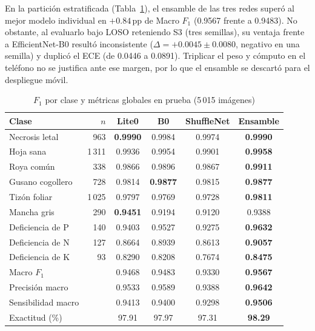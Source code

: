 \documentclass[conference,letterpaper]{IEEEtran}
\newcommand{\Fone}{$F_1$}
\begin{document}
En la partición estratificada (Tabla~\ref{tab:ensamble}), el ensamble de las tres redes superó al mejor modelo individual en $+0.84$\,pp de Macro \Fone{} (0.9567 frente a 0.9483). No obstante, al evaluarlo bajo LOSO reteniendo S3 (tres semillas), su ventaja frente a EfficientNet-B0 resultó inconsistente ($\Delta=+0.0045\pm0.0080$, negativo en una semilla) y duplicó el ECE (de 0.0446 a 0.0891). Triplicar el peso y cómputo en el teléfono no se justifica ante ese margen, por lo que el ensamble se descartó para el despliegue móvil.

\begin{table}[!t]
\caption{\Fone{} por clase y métricas globales en prueba (5\,015 imágenes)}
\label{tab:ensamble}
\centering
\scriptsize
\setlength{\tabcolsep}{3pt}
\begin{tabular}{@{}lrcccc@{}}
\toprule
\textbf{Clase} & \textbf{$n$} & \textbf{Lite0} & \textbf{B0} & \textbf{ShuffleNet} & \textbf{Ensamble} \\
\midrule
Necrosis letal & 963 & \textbf{0.9990} & 0.9984 & 0.9974 & \textbf{0.9990} \\
Hoja sana & 1\,311 & 0.9936 & 0.9954 & 0.9901 & \textbf{0.9958} \\
Roya común & 338 & 0.9866 & 0.9896 & 0.9867 & \textbf{0.9911} \\
Gusano cogollero & 728 & 0.9814 & \textbf{0.9877} & 0.9815 & \textbf{0.9877} \\
Tizón foliar & 1\,025 & 0.9797 & 0.9769 & 0.9728 & \textbf{0.9811} \\
Mancha gris & 290 & \textbf{0.9451} & 0.9194 & 0.9120 & 0.9388 \\
Deficiencia de P & 140 & 0.9403 & 0.9527 & 0.9275 & \textbf{0.9632} \\
Deficiencia de N & 127 & 0.8664 & 0.8939 & 0.8613 & \textbf{0.9057} \\
Deficiencia de K & 93 & 0.8290 & 0.8208 & 0.7674 & \textbf{0.8475} \\
\midrule
Macro \Fone{} & & 0.9468 & 0.9483 & 0.9330 & \textbf{0.9567} \\
Precisión macro & & 0.9533 & 0.9589 & 0.9388 & \textbf{0.9642} \\
Sensibilidad macro & & 0.9413 & 0.9400 & 0.9298 & \textbf{0.9506} \\
Exactitud (\%) & & 97.91 & 97.97 & 97.31 & \textbf{98.29} \\
\bottomrule
\end{tabular}
\end{table}
\end{document}
